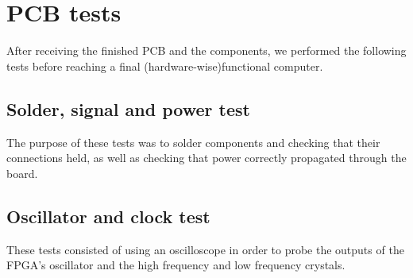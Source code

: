 \documentclass[../main/report.tex]{subfiles}
\begin{document}
\section{PCB tests}

After receiving the finished PCB and the components, we performed the following tests before reaching a final (hardware-wise)functional computer.   

\subsection{Solder, signal and power test}

The purpose of these tests was to solder components and checking that their connections held, as well as checking that power correctly propagated through the board.  



\subsection{Oscillator and clock test}

These tests consisted of using an oscilloscope in order to probe the outputs of the FPGA's oscillator and the high frequency and low frequency crystals.


\end{document}
